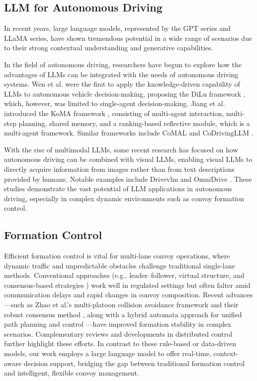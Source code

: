 \subsection{LLM for Autonomous Driving} In recent years, large language models, represented by the GPT series and LLaMA series, have shown tremendous potential in a wide range of scenarios due to their strong contextual understanding and generative capabilities.

In the field of autonomous driving, researchers have begun to explore how the advantages of LLMs can be integrated with the needs of autonomous driving systems. Wen et al. were the first to apply the knowledge-driven capability of LLMs to autonomous vehicle decision-making, proposing the DiLu framework \cite{wen2023dilu}, which, however, was limited to single-agent decision-making. Jiang et al. introduced the KoMA framework \cite{jiang2024koma}, consisting of multi-agent interaction, multi-step planning, shared memory, and a ranking-based reflective module, which is a multi-agent framework. Similar frameworks include CoMAL \cite{yao2024comal} and CoDrivingLLM \cite{fang2024towards}.

With the rise of multimodal LLMs, some recent research has focused on how autonomous driving can be combined with visual LLMs, enabling visual LLMs to directly acquire information from images rather than from text descriptions provided by humans. Notable examples include Drivevlm \cite{tian2024drivevlm} and OmniDrive \cite{wang2024omnidrive}. These studies demonstrate the vast potential of LLM applications in autonomous driving, especially in complex dynamic environments such as convoy formation control.

\subsection{Formation Control} Efficient formation control is vital for multi-lane convoy operations, where dynamic traffic and unpredictable obstacles challenge traditional single-lane methods. Conventional approaches (e.g., leader–follower, virtual structure, and consensus-based strategies \cite{chen2023survey}) work well in regulated settings but often falter amid communication delays and rapid changes in convoy composition. Recent advances—such as Zhao et al.'s multi-platoon collision avoidance framework \cite{zhao2023multi} and their robust consensus method \cite{zhao2022consensus}, along with a hybrid automata approach for unified path planning and control \cite{huang2018path}—have improved formation stability in complex scenarios. Complementary reviews and developments in distributed control \cite{chu2024survey, yang2023distributed} further highlight these efforts. In contrast to these rule-based or data-driven models, our work employs a large language model to offer real-time, context-aware decision support, bridging the gap between traditional formation control and intelligent, flexible convoy management.